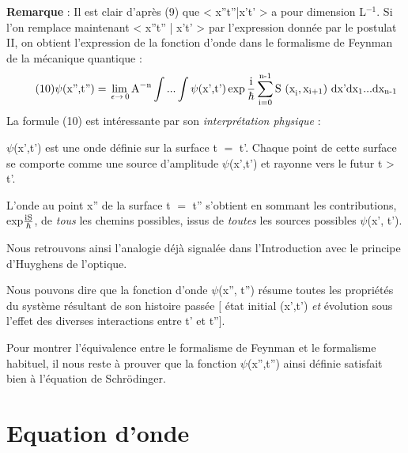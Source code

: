 %
{\bf Remarque} : Il est clair d'après (9) que < x''t''|x't' > a pour dimension L$^{-1}$.
Si l'on remplace maintenant < x''t'' | x't' > par l'expression donnée par le
postulat II, on obtient l'expression de la fonction d'onde dans le formalisme de Feynman de la mécanique quantique :
\[
\tag{10}\psi(\text{x'',t''}) = \lim_{\,\epsilon \to \,0} \text{A}^{-\text{n}}
\int...\int\psi(\text{x',t'})
\exp\frac{\text{i}}{\hbar}\sum_{\text{i=0}}^{\text{n-1}} \text{S (x}_{\text{i}},\text{x}_{\text{i+1}})
\text{ dx'}\text{dx}_1...\text{dx}_{\text{n-1}}
\]
La formule (10) est intéressante par son {\it interprétation physique} :
\begin{center}
\end{center}
$\psi$(x',t') est une onde définie sur la surface t $=$ t'. Chaque point de cette
surface se comporte comme une source d'amplitude $\psi$(x',t') et rayonne vers
le futur t > t'.

L'onde au point x'' de la surface t $=$ t'' s'obtient en sommant les
contributions, exp$\frac{\text{iS}}{\hbar}$, de {\it tous} les chemins possibles,
issus de {\it toutes} les sources possibles $\psi$(x', t').

Nous retrouvons ainsi l'analogie déjà signalée dans l'Introduction
avec le principe d'Huyghens de l'optique.

Nous pouvons dire que la fonction d'onde $\psi$(x'', t'') résume toutes les
propriétés du système résultant de son histoire passée $[$ état initial (x',t')
{\it et} évolution sous l'effet des diverses interactions entre t' et t''$]$.

Pour montrer l'équivalence entre le formalisme de Feynman et le
formalisme habituel, il nous reste à prouver que la fonction $\psi$(x'',t'') ainsi
définie satisfait bien à l'équation de Schrödinger.
%
\section{Equation d'onde}

